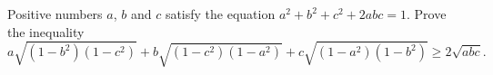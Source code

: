 \problem
Positive numbers $a$, $b$ and $c$ satisfy the equation $a^2+b^2+c^2+2abc=1$.
Prove the inequality
\[
    a \sqrt{(1 - b^2) (1 - c^2)}
    +
    b \sqrt{(1 - c^2) (1 - a^2)}
    +
    c \sqrt{(1 - a^2) (1 - b^2)}
\geq
    2 \sqrt{abc}
.\]
\solution
\endproblem
